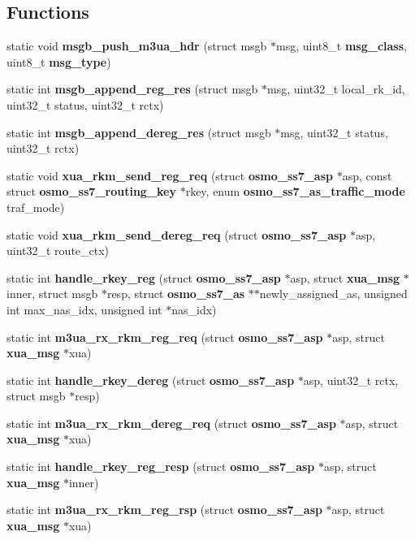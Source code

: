 \subsection*{Functions}
\begin{DoxyCompactItemize}
\item 
static void {\bf msgb\+\_\+push\+\_\+m3ua\+\_\+hdr} (struct msgb $\ast$msg, uint8\+\_\+t {\bf msg\+\_\+class}, uint8\+\_\+t {\bf msg\+\_\+type})
\item 
static int {\bf msgb\+\_\+append\+\_\+reg\+\_\+res} (struct msgb $\ast$msg, uint32\+\_\+t local\+\_\+rk\+\_\+id, uint32\+\_\+t status, uint32\+\_\+t rctx)
\item 
static int {\bf msgb\+\_\+append\+\_\+dereg\+\_\+res} (struct msgb $\ast$msg, uint32\+\_\+t status, uint32\+\_\+t rctx)
\item 
static void {\bf xua\+\_\+rkm\+\_\+send\+\_\+reg\+\_\+req} (struct {\bf osmo\+\_\+ss7\+\_\+asp} $\ast$asp, const struct {\bf osmo\+\_\+ss7\+\_\+routing\+\_\+key} $\ast$rkey, enum {\bf osmo\+\_\+ss7\+\_\+as\+\_\+traffic\+\_\+mode} traf\+\_\+mode)
\item 
static void {\bf xua\+\_\+rkm\+\_\+send\+\_\+dereg\+\_\+req} (struct {\bf osmo\+\_\+ss7\+\_\+asp} $\ast$asp, uint32\+\_\+t route\+\_\+ctx)
\item 
static int {\bf handle\+\_\+rkey\+\_\+reg} (struct {\bf osmo\+\_\+ss7\+\_\+asp} $\ast$asp, struct {\bf xua\+\_\+msg} $\ast$inner, struct msgb $\ast$resp, struct {\bf osmo\+\_\+ss7\+\_\+as} $\ast$$\ast$newly\+\_\+assigned\+\_\+as, unsigned int max\+\_\+nas\+\_\+idx, unsigned int $\ast$nas\+\_\+idx)
\item 
static int {\bf m3ua\+\_\+rx\+\_\+rkm\+\_\+reg\+\_\+req} (struct {\bf osmo\+\_\+ss7\+\_\+asp} $\ast$asp, struct {\bf xua\+\_\+msg} $\ast$xua)
\item 
static int {\bf handle\+\_\+rkey\+\_\+dereg} (struct {\bf osmo\+\_\+ss7\+\_\+asp} $\ast$asp, uint32\+\_\+t rctx, struct msgb $\ast$resp)
\item 
static int {\bf m3ua\+\_\+rx\+\_\+rkm\+\_\+dereg\+\_\+req} (struct {\bf osmo\+\_\+ss7\+\_\+asp} $\ast$asp, struct {\bf xua\+\_\+msg} $\ast$xua)
\item 
static int {\bf handle\+\_\+rkey\+\_\+reg\+\_\+resp} (struct {\bf osmo\+\_\+ss7\+\_\+asp} $\ast$asp, struct {\bf xua\+\_\+msg} $\ast$inner)
\item 
static int {\bf m3ua\+\_\+rx\+\_\+rkm\+\_\+reg\+\_\+rsp} (struct {\bf osmo\+\_\+ss7\+\_\+asp} $\ast$asp, struct {\bf xua\+\_\+msg} $\ast$xua)
\item 
$$
\end{DoxyCompactItemize}
